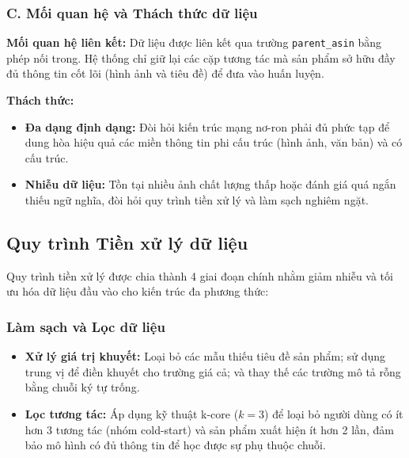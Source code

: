 \subsubsection*{C. Mối quan hệ và Thách thức dữ liệu}
\textbf{Mối quan hệ liên kết:} Dữ liệu được liên kết qua trường \texttt{parent\_asin} bằng phép nối trong. Hệ thống chỉ giữ lại các cặp tương tác mà sản phẩm sở hữu đầy đủ thông tin cốt lõi (hình ảnh và tiêu đề) để đưa vào huấn luyện.

\textbf{Thách thức:} 
\begin{itemize}
    \item \textbf{Đa dạng định dạng:} Đòi hỏi kiến trúc mạng nơ-ron phải đủ phức tạp để dung hòa hiệu quả các miền thông tin phi cấu trúc (hình ảnh, văn bản) và có cấu trúc.
    \item \textbf{Nhiễu dữ liệu:} Tồn tại nhiều ảnh chất lượng thấp hoặc đánh giá quá ngắn thiếu ngữ nghĩa, đòi hỏi quy trình tiền xử lý và làm sạch nghiêm ngặt.
\end{itemize}


\subsection{Quy trình Tiền xử lý dữ liệu}
\label{sec:preprocessing}

Quy trình tiền xử lý được chia thành 4 giai đoạn chính nhằm giảm nhiễu và tối ưu hóa dữ liệu đầu vào cho kiến trúc đa phương thức:

\subsubsection{Làm sạch và Lọc dữ liệu}
\begin{itemize}
    \item \textbf{Xử lý giá trị khuyết:} Loại bỏ các mẫu thiếu tiêu đề sản phẩm; sử dụng trung vị để điền khuyết cho trường giá cả; và thay thế các trường mô tả rỗng bằng chuỗi ký tự trống.
    \item \textbf{Lọc tương tác:} Áp dụng kỹ thuật k-core ($k=3$) để loại bỏ người dùng có ít hơn 3 tương tác (nhóm cold-start) và sản phẩm xuất hiện ít hơn 2 lần, đảm bảo mô hình có đủ thông tin để học được sự phụ thuộc chuỗi.
\end{itemize}

